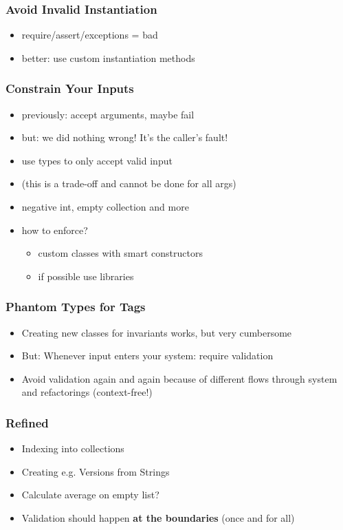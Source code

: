 \documentclass{beamer}
\begin{document}
\begin{frame}
  \frametitle{Avoid Invalid Instantiation}
  \begin{itemize}
  \item require/assert/exceptions = bad
  \item better: use custom instantiation methods
  \end{itemize}
\end{frame}

\begin{frame}
  \frametitle{Constrain Your Inputs}
  \begin{itemize}
  \item previously: accept arguments, maybe fail
  \item but: we did nothing wrong!  It's the caller's fault!
  \item use types to only accept valid input
  \item (this is a trade-off and cannot be done for all args)
  \item negative int, empty collection and more
  \item how to enforce?
    \begin{itemize}
    \item custom classes with smart constructors
    \item if possible use libraries
    \end{itemize}
  \end{itemize}
\end{frame}

\begin{frame}
  \frametitle{Phantom Types for Tags}
  \begin{itemize}
  \item Creating new classes for invariants works, but very cumbersome
  \item But: Whenever input enters your system: require validation
  \item Avoid validation again and again because of different flows
    through system and refactorings (context-free!)
  \end{itemize}
\end{frame}

\begin{frame}
  \frametitle{Refined}
  \begin{itemize}
  \item Indexing into collections
  \item Creating e.g. Versions from Strings
  \item Calculate average on empty list?
  \item Validation should happen \textbf{at the boundaries} (once and
    for all)
  \end{itemize}
\end{frame}
\end{document}
